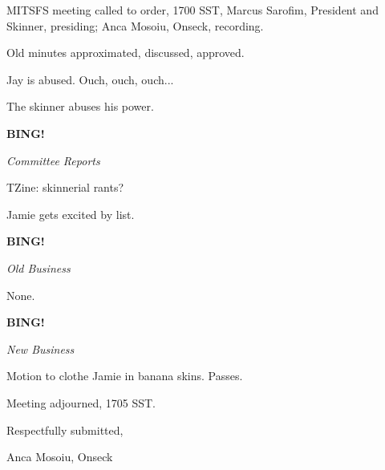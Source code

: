 \documentclass[12pt]{article}
\newcommand{\bing}{{\bf BING!} }
\newcommand{\goto}[1]{\bing \vskip 12pt \centerline{{\em{#1}}}}
\begin{document}
\vspace{18pt}

\setlength{\parskip}{6pt}

\noindent
MITSFS meeting called to order, 1700 SST,
Marcus Sarofim, President and Skinner, presiding; Anca Mosoiu, Onseck, recording.

Old minutes approximated, discussed, approved.

Jay is abused. Ouch, ouch, ouch...

The skinner abuses his power.

\goto{Committee Reports}

TZine: skinnerial rants?

Jamie gets excited by list.

\goto{Old Business}

None.

\goto{New Business}

Motion to clothe Jamie in banana skins. Passes.

\vspace{12pt}

\noindent
Meeting adjourned, 1705 SST.

\vspace{18pt}

\centerline{Respectfully submitted,}
\centerline{Anca Mosoiu, Onseck}
\end{document}
